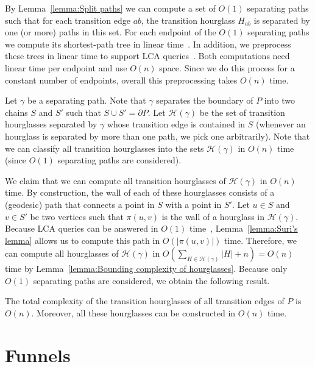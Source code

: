 \documentclass[a4paper,UKenglish]{lipics}
\newcommand{\p}[2]{\ensuremath{\pi(#1, #2)}}
\begin{document}
By Lemma~\ref{lemma:Split paths} we can compute a set of $O(1)$ separating paths such that for each transition edge $ab$, the transition hourglass $H_{ab}$ is separated by one (or more) paths in this set. For each endpoint of the $O(1)$ separating paths we compute its shortest-path tree in linear time~\cite{chazelle1991triangulating,guibasShortestPathTree}. In addition, we preprocess these trees in linear time to support LCA queries~\cite{harel1984fast}. Both computations need linear time per endpoint and use $O(n)$ space. Since we do this process for a constant number of endpoints, overall this preprocessing takes $O(n)$ time. 

Let $\gamma$ be a separating path. Note that $\gamma$ separates the boundary of $P$ into two chains $S$ and $S'$ such that $S\cup S' = \partial P$.
Let $\mathcal H(\gamma)$ be the set of transition hourglasses separated by $\gamma$ whose transition edge is contained in $S$ (whenever an hourglass is separated by more than one path, we pick one arbitrarily). Note that we can classify all transition hourglasses into the sets $\mathcal H(\gamma)$ in $O(n)$ time (since $O(1)$ separating paths are considered).

We claim that we can compute all transition hourglasses of $\mathcal H(\gamma)$ in $O(n)$ time.
By construction, the wall of each of these hourglasses consists of a (geodesic) path that connects a point in $S$ with a point in $S'$. Let $u\in S$ and $v\in S'$ be two vertices such that $\p{u}{v}$ is the wall of a hourglass in $\mathcal H(\gamma)$.
Because LCA queries can be answered in $O(1)$ time~\cite{harel1984fast}, 
Lemma~\ref{lemma:Suri's lemma} allows us to compute this path in $O(|\p{u}{v}|)$ time. 
Therefore, we can compute all hourglasses of $\mathcal H(\gamma)$ in $O(\sum_{H\in \mathcal H(\gamma)} |H| + n) = O(n)$ time by Lemma~\ref{lemma:Bounding complexity of hourglasses}. 
Because only $O(1)$ separating paths are considered, we obtain the following result.

\begin{lemma}\label{lemma: Hourglass partition}
The total complexity of the transition hourglasses of all transition edges of $P$ is $O(n)$.
Moreover, all these hourglasses can be constructed in $O(n)$ time.
\end{lemma}

\section{Funnels}
\end{document}
